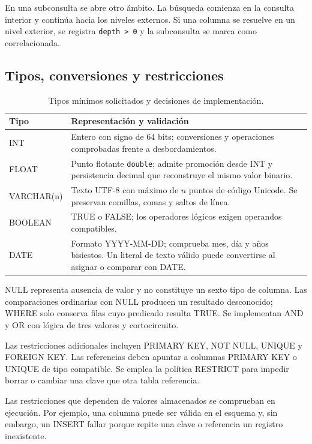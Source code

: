 \documentclass[11pt,a4paper]{article}
\begin{document}
En una subconsulta se abre otro ámbito. La búsqueda comienza en la
consulta interior y continúa hacia los niveles externos. Si una columna
se resuelve en un nivel exterior, se registra \texttt{depth > 0} y la
subconsulta se marca como correlacionada.

\subsection{Tipos, conversiones y restricciones}

\begin{table}[H]\centering\small
\begin{tabularx}{\textwidth}{@{}L{2.8cm}Y@{}}
\toprule\textbf{Tipo} & \textbf{Representación y validación}\\\midrule
INT & Entero con signo de 64 bits; conversiones y operaciones comprobadas frente a desbordamientos.\\
FLOAT & Punto flotante \texttt{double}; admite promoción desde INT y persistencia decimal que reconstruye el mismo valor binario.\\
VARCHAR(n) & Texto UTF-8 con máximo de \(n\) puntos de código Unicode. Se preservan comillas, comas y saltos de línea.\\
BOOLEAN & TRUE o FALSE; los operadores lógicos exigen operandos compatibles.\\
DATE & Formato YYYY-MM-DD; comprueba mes, día y años bisiestos. Un literal de texto válido puede convertirse al asignar o comparar con DATE.\\
\bottomrule
\end{tabularx}
\caption{Tipos mínimos solicitados y decisiones de implementación.}
\end{table}

NULL representa ausencia de valor y no constituye un sexto tipo de columna.
Las comparaciones ordinarias con NULL producen un resultado desconocido;
WHERE solo conserva filas cuyo predicado resulta TRUE. Se implementan
AND y OR con lógica de tres valores y cortocircuito.

Las restricciones adicionales incluyen PRIMARY KEY, NOT NULL, UNIQUE y
FOREIGN KEY. Las referencias deben apuntar a columnas PRIMARY KEY o
UNIQUE de tipo compatible. Se emplea la política RESTRICT para impedir
borrar o cambiar una clave que otra tabla referencia.

Las restricciones que dependen de valores almacenados se comprueban en
ejecución. Por ejemplo, una columna puede ser válida en el esquema y,
sin embargo, un INSERT fallar porque repite una clave o referencia un
registro inexistente.
\end{document}
